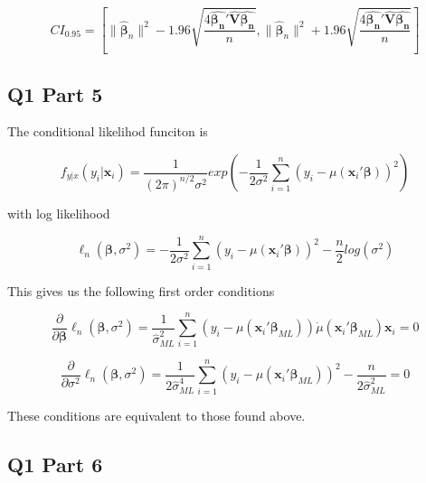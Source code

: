 \documentclass[11pt]{article}
\begin{document}
$$ CI_{0.95} = \left[ \lVert \hat{\bm{\beta}}_n \rVert ^2 - 1.96 \sqrt{\frac{4\hat{\bm{\beta_n}}'\hat{\bm{V}} \hat{\bm{\beta_n}} }{n}},  \lVert \hat{\bm{\beta}}_n \rVert ^2 + 1.96 \sqrt{\frac{4\hat{\bm{\beta_n}}'\hat{\bm{V}} \hat{\bm{\beta_n}} }{n}} \right] 
$$

\subsection{Q1 Part 5}
The conditional likelihod funciton is 

$$f_{y|x}(y_i|\bm{x}_i) = \frac{1}{(2\pi)^{n/2} \sigma^2} exp \left( -\frac{1}{2 \sigma^2} \sum_{i=1}^{n}(y_i - \mu(\bm{x}_i'\bm{\beta}))^2 \right)
$$

with log likelihood 

$$ \ell_n(\bm{\beta}, \sigma^2) = -\frac{1}{2\sigma^2} \sum_{i=1}^{n}(y_i - \mu(\bm{x}_i' \bm{\beta}))^2 - \frac{n}{2}log(\sigma^2)
$$

This gives us the following first order conditions 

$$ \frac{\partial}{\partial \bm{\beta}} \ell_n(\bm{\beta}, \sigma^2) = \frac{1}{\hat{\sigma}_{ML}^2} \sum_{i=1}^{n}(y_i - \mu(\bm{x}_i' \bm{\beta}_{ML}))\dot{\mu}(\bm{x}_i' \bm{\beta}_{ML})\bm{x}_i = 0
$$

$$\frac{\partial}{\partial \sigma^2} \ell_n(\bm{\beta}, \sigma^2) =
\frac{1}{2\hat{\sigma}_{ML}^4} \sum_{i=1}^{n}(y_i - \mu(\bm{x}_i' \bm{\beta}_{ML}))^2 - \frac{n}{2 \hat{\sigma}_{ML}^2} =0
$$

These conditions are equivalent to those found above. 

\subsection{Q1 Part 6}

\end{document}
